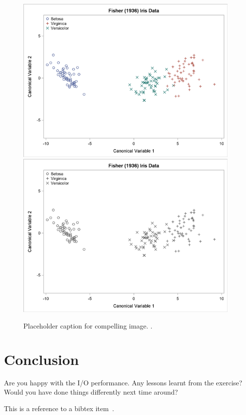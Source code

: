 \begin{figure}[h!]
\centering
\myIfColor
{
\includegraphics[width=0.99\textwidth]{Chapters/part4-ch5-s3d/figs/canonical.png}
}
{
\includegraphics[width=0.99\textwidth]{Chapters/part4-ch5-s3d/figs/canonical-bw.png}
}
\caption[Placeholder caption for compelling image.]
{Placeholder caption for compelling image. .
}
\label{part4-ch5-s3d:fig:image1}
\end{figure}

\section{Conclusion}
Are you happy with the I/O performance. Any lessons learnt from the exercise? Would you have done things differently next time around? 

This is a reference to a bibtex item~\cite{Snir:MPI}.

